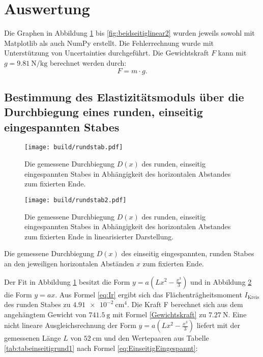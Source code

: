 
\section{Auswertung}
\label{sec:Auswertung}
Die Graphen in Abbildung \ref{fig:rund} bis \ref{fig:beidseitiglinear2} wurden
 jeweils sowohl mit Matplotlib \cite{matplotlib} als auch NumPy \cite{numpy} erstellt.
  Die Fehlerrechnung wurde mit Unterstützung von Uncertainties \cite{uncertainties}
	 durchgeführt. Die Gewichtskraft $F$ kann mit $g=\SI{9.81}{\newton\per\kilogram}$ \cite{g} berechnet werden durch:
\begin{equation}
	F = m \cdot g \text{.} \label{Gewichtskraft}
\end{equation}

\subsection{Bestimmung des Elastizitätsmoduls über die Durchbiegung eines runden, einseitig eingespannten Stabes}
\begin{figure}
	\centering
	\caption{Die gemessene Durchbiegung $D(x)$ des runden, einseitig eingespannten Stabes
	 in Abhängigkeit des horizontalen Abstandes zum fixierten Ende.}
	\texttt{[image: build/rundstab.pdf]}
	\label{fig:rund}
\end{figure}
\begin{figure}
	\centering
	\caption{Die gemessene Durchbiegung $D(x)$ des runden, einseitig eingespannten Stabes
	 in Abhängigkeit des horizontalen Abstandes zum fixierten Ende in linearisierter Darstellung.}
	\texttt{[image: build/rundstab2.pdf]}
	\label{fig:rundlinear}
\end{figure}
\begin{table}
	\caption{Die gemessene Durchbiegung $D(x)$ des einseitig eingespannten, runden Stabes an den jeweiligen horizontalen Abständen $x$ zum fixierten Ende.}
	\begin{minipage}{0.5\textwidth}
		\centering
		
	\end{minipage}
	\begin{minipage}{0.5\textwidth}
		\centering
		
	\end{minipage}
\end{table}
Der Fit in Abbildung \ref{fig:rund} besitzt die Form $y = a ( L x^2 - \frac{x^3}{3} ) $ und in Abbildung \ref{fig:rundlinear} die Form $y=a x$. Aus Formel \eqref{eq:Ir} ergibt sich das Flächenträgheitsmoment $I_\text{Kreis}$ des runden Stabes  zu $\SI{4.91e-2}{\centi\meter\tothe{4}}$. Die Kraft F berechnet sich aus dem angehängtem Gewicht von $\SI{741.5}{\gram}$ mit Formel \eqref{Gewichtskraft} zu $\SI{7.27}{\newton}$. Eine nicht lineare Ausgleichsrechnung der Form $y = a ( L x^2 - \frac{x^3}{3})$ liefert mit der gemessenen Länge $L$ von $\SI{52}{\centi\meter}$ und den Wertepaaren aus Tabelle \ref{tab:tabeinseitigrund1} nach Formel \eqref{eq:EinseitigEingespannt}:
